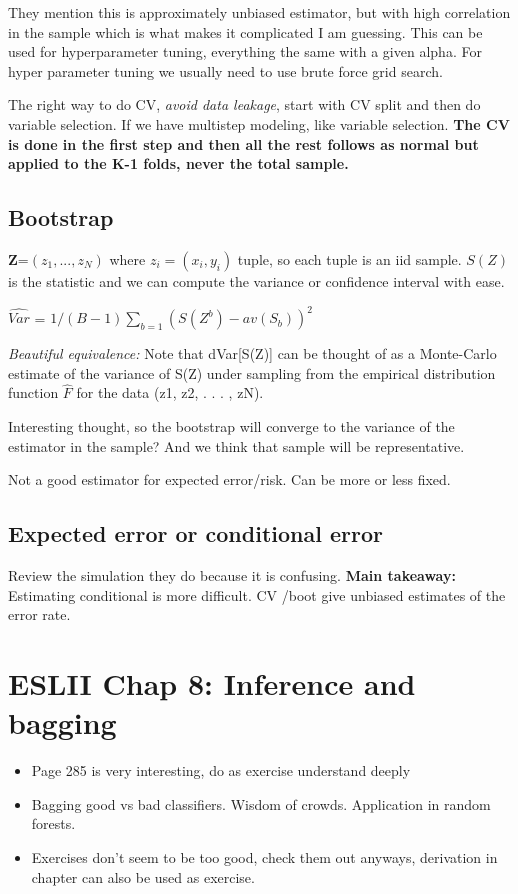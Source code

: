 \documentclass{article}
\begin{document}
They mention this is approximately unbiased estimator, but with high correlation in the sample which is what makes it complicated I am guessing.
This can be used for hyperparameter tuning, everything the same with a given alpha. 
For hyper parameter tuning we usually need to use brute force grid search.

The right way to do CV, \textit{avoid data leakage}, start with CV split and then do variable selection. 
If we have multistep modeling, like variable selection. \textbf{The CV is done in the first step and then all the rest follows as normal but applied to the K-1 folds, never the total sample.}

\subsection{Bootstrap}
\textbf{Z}=$(z_1,...,z_N)$ where $z_i = (x_i,y_i)$ tuple, so each tuple is an iid sample.
$S(Z) $ is the statistic and we can compute the variance or confidence interval with ease.

$\hat{Var}$ = $1/(B-1)\sum_{b=1}(S(Z^b)-av(S_b))^2$

\textit{Beautiful equivalence: }Note that dVar[S(Z)] can be thought of as a
Monte-Carlo estimate of the variance of S(Z) under sampling from the
empirical distribution function  $\hat{F}$ for the data (z1, z2, . . . , zN). 

Interesting thought, so the bootstrap will converge to the variance of the estimator in the sample? And we think that sample will be representative.

Not a good estimator for expected error/risk. Can be more or less fixed.

\subsection{Expected error or conditional error}

Review the simulation they do because it is confusing. 
\textbf{Main takeaway:} Estimating conditional is more difficult. CV /boot give unbiased estimates of the error rate.


\section{ESLII Chap 8: Inference and bagging}
\begin{itemize}
    \item Page 285 is very interesting, do as exercise understand deeply
    \item Bagging good vs bad classifiers. Wisdom of crowds. Application in random forests.
    \item Exercises don't seem to be too good, check them out anyways, derivation in chapter can also be used as exercise.
\end{itemize}
\end{document}
